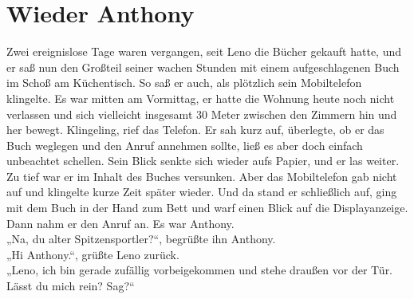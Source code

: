 \documentclass[ngerman,smalldemyvopaper,11pt,oneside,onecolumn,openright,extrafontsizes]{memoir}
\begin{document}
\chapter{Wieder Anthony}
Zwei ereignislose Tage waren vergangen, seit Leno die Bücher gekauft hatte, und er saß nun den Großteil seiner wachen Stunden mit einem aufgeschlagenen Buch im Schoß am Küchentisch. So saß er auch, als plötzlich sein Mobiltelefon klingelte. Es war mitten am Vormittag, er hatte die Wohnung heute noch nicht verlassen und sich vielleicht insgesamt 30 Meter zwischen den Zimmern hin und her bewegt. Klingeling, rief das Telefon. Er sah kurz auf, überlegte, ob er das Buch weglegen und den Anruf annehmen sollte, ließ es aber doch einfach unbeachtet schellen. Sein Blick senkte sich wieder aufs Papier, und er las weiter. Zu tief war er im Inhalt des Buches versunken. Aber das Mobiltelefon gab nicht auf und klingelte kurze Zeit später wieder. Und da stand er schließlich auf, ging mit dem Buch in der Hand zum Bett und warf einen Blick auf die Displayanzeige. Dann nahm er den Anruf an. Es war Anthony.
\vspace{0.5em} \\
„Na, du alter Spitzensportler?“, begrüßte ihn Anthony.
\vspace{0.5em} \\
„Hi Anthony.“, grüßte Leno zurück.
\vspace{0.5em} \\
„Leno, ich bin gerade zufällig vorbeigekommen und stehe draußen vor der Tür. Lässt du mich rein? Sag?“
\vspace{0.5em} \\
\end{document}
